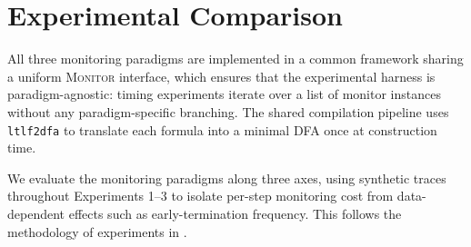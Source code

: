 \section{Experimental Comparison}
\label{sec:experiments}

All three monitoring paradigms are implemented in a common framework sharing a uniform \textsc{Monitor} interface, which ensures that the experimental harness is paradigm-agnostic: timing experiments iterate over a list of monitor instances without any paradigm-specific branching. The shared compilation pipeline uses \texttt{ltlf2dfa} \cite{fuggitti-ltlf2dfa} to translate each \ltlf formula into a minimal DFA once at construction time.

We evaluate the monitoring paradigms along three axes, using synthetic traces throughout Experiments 1–3 to isolate per-step monitoring cost from data-dependent effects such as early-termination frequency. This follows the methodology of experiments in \cite{perotti2014neural}. 



